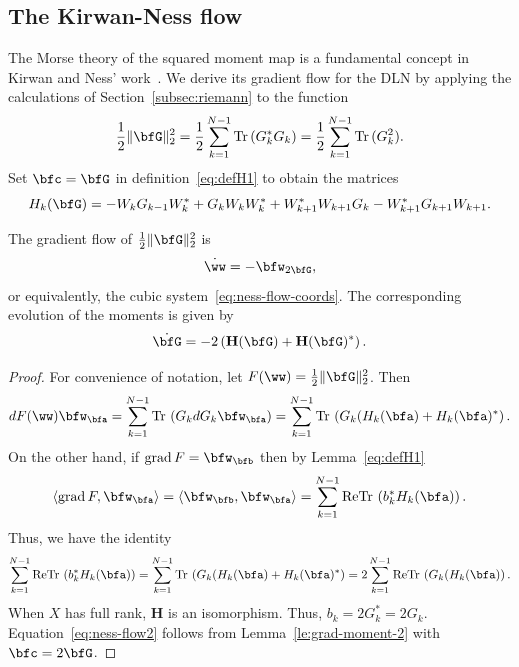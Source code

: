 \subsection{The Kirwan-Ness flow}
\label{sec:ness}
The Morse theory of the squared moment map is a fundamental concept in Kirwan and Ness' work~\cite{Kirwan,Ness}. We derive its gradient flow for the DLN by applying the calculations of Section~\ref{subsec:riemann} to the function
\begin{equation}
    \label{eq:ness-function}
    \frac{1}{2} \|\bfG\|_2^2 = \frac{1}{2} \sum_{k=1}^{N-1} \Tr(G_k^*G_k) = \frac{1}{2} \sum_{k=1}^{N-1} \Tr(G_k^2).
\end{equation}
Set $\bfc=\bfG$ in definition~\ref{eq:defH1} to obtain the matrices
\begin{equation}
     \label{eq:defH7}
     H_k(\bfG)= - W_k G_{k-1} W_k^* + G_k W_k W_k^*  + W^*_{k+1}W_{k+1} G_k - W^*_{k+1}G_{k+1}W_{k+1}.
 \end{equation}
 \begin{theorem}
     \label{thm:ness-flow}
The gradient flow of $\tfrac{1}{2}\|\bfG\|^2_2$ is 
\begin{equation}
\label{eq:ness-flow1}
    \dot{\ww} = -  \bfw_{2\bfG},
\end{equation}
or equivalently, the cubic system~\eqref{eq:ness-flow-coords}. The corresponding evolution of the moments is given by
\begin{equation}
\label{eq:ness-flow2}
    \dot{\bfG} = - 2\left( \mathbf{H}(\bfG) + \mathbf{H}(\bfG)^*\right).
\end{equation}
\end{theorem}
\begin{proof}
For convenience of notation, let $F(\ww)=\tfrac{1}{2}\|\bfG \|_2^2$. Then 
\begin{equation}
\label{eq:ness-flow3}
dF(\ww)\bfw_\bfa = \sum_{k=1}^{N-1} \Tr \left( G_k dG_k \bfw_\bfa\right)=   \sum_{k=1}^{N-1} \Tr \left( G_k (H_k(\bfa)+ H_k(\bfa)^*\right).    
\end{equation} 
On the other hand, if $\grad F = \bfw_\bfb$ then by Lemma~\ref{eq:defH1}
\begin{equation} 
\label{eq:ness-flow4}
\langle \grad F, \bfw_\bfa \rangle = \langle \bfw_\bfb, \bfw_\bfa \rangle= \sum_{k=1}^{N-1} \mathrm{Re} \Tr \left(b_k^*H_k(\bfa)\right). 
\end{equation}
Thus, we have the identity
\begin{equation} 
\label{eq:ness-flow5}
\sum_{k=1}^{N-1} \mathrm{Re}  \Tr \left(b_k^*H_k(\bfa)\right) =  \sum_{k=1}^{N-1} \Tr \left( G_k (H_k(\bfa)+ H_k(\bfa)^*\right) = 2 \sum_{k=1}^{N-1} \mathrm{Re} \Tr \left( G_k (H_k(\bfa)\right). 
\end{equation}
When $X$ has full rank, $\mathbf{H}$ is an isomorphism. Thus, $b_k=2G_k^*=2G_k$. Equation~\eqref{eq:ness-flow2} follows from Lemma~\ref{le:grad-moment-2} with $\bfc=2\bfG$.
\end{proof}

